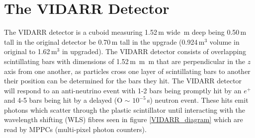 \documentclass[12pt,a4paper]{article}
\begin{document}
\section{The VIDARR Detector}
The VIDARR detector is a cuboid measuring 1.52\,m wide \,m deep being 0.50\,m tall in the original detector be 0.70\,m tall in the upgrade (0.924\,m$^3$ volume in original to 1.62\,m$^3$ in upgraded). The VIDARR detector consists of overlapping scintillating bars with dimensions of 1.52\,m \,m \,m that are perpendicular in the $z$ axis from one another, as particles cross one layer of scintillating bars to another their position can be determined for the bars they hit. The VIDARR detector will respond to an anti-neutrino event with 1-2 bars being promptly hit by an $e^+$ and 4-5 bars being hit by a delayed (O $\sim$ $10^{-5}$\,s) neutron event. These hits emit photons which scatter through the plastic scintillator until interacting with the wavelength shifting (WLS) fibres seen in figure \ref{VIDARR_diagram} which are read by MPPCs (multi-pixel photon counters).  
\end{document}

